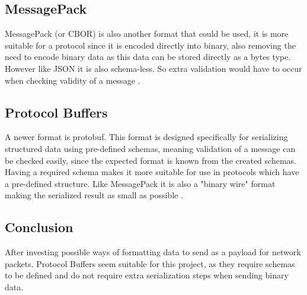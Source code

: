 \subsection*{MessagePack}
MessagePack (or CBOR) is also another format that could be used, it is more suitable for a protocol since it is encoded directly into binary, also removing the need to encode binary data as this data can be stored directly as a bytes type. However like JSON it is also schema-less. So extra validation would have to occur when checking validity of a message \parencite{msgpack} \parencite{cbor-rfc8949}.

\subsection*{Protocol Buffers}
A newer format is protobuf. This format is designed specifically for serializing structured data using pre-defined schemas, meaning validation of a message can be checked easily, since the expected format is known from the created schemas. Having a required schema makes it more suitable for use in protocols which have a pre-defined structure. Like MessagePack it is also a "binary wire" format making the serialized result as small as possible \parencite{protobuf-3}.

\subsection*{Conclusion}
After investing possible ways of formatting data to send as a payload for network packets. Protocol Buffers seem suitable for this project, as they require schemas to be defined and do not require extra serialization steps when sending binary data.

